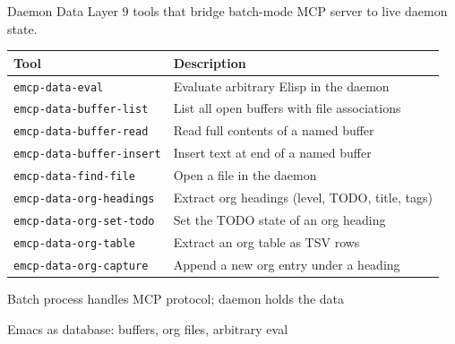 \documentclass[presentation]{beamer}
\begin{document}
\begin{frame}[label={sec:org86767bd},fragile]{Daemon Data Layer}
 9 tools that bridge batch-mode MCP server to live daemon state.

\begin{center}
\begin{tabular}{ll}
Tool & Description\\
\hline
\texttt{emcp-data-eval} & Evaluate arbitrary Elisp in the daemon\\
\texttt{emcp-data-buffer-list} & List all open buffers with file associations\\
\texttt{emcp-data-buffer-read} & Read full contents of a named buffer\\
\texttt{emcp-data-buffer-insert} & Insert text at end of a named buffer\\
\texttt{emcp-data-find-file} & Open a file in the daemon\\
\texttt{emcp-data-org-headings} & Extract org headings (level, TODO, title, tags)\\
\texttt{emcp-data-org-set-todo} & Set the TODO state of an org heading\\
\texttt{emcp-data-org-table} & Extract an org table as TSV rows\\
\texttt{emcp-data-org-capture} & Append a new org entry under a heading\\
\end{tabular}
\end{center}
\begin{block}{Batch process handles MCP protocol; daemon holds the data}
\end{block}
\begin{block}{Emacs as database: buffers, org files, arbitrary eval}
\end{block}
\end{frame}
\end{document}
